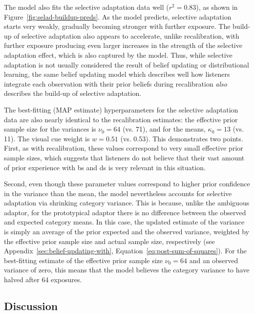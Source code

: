 The model also fits the selective adaptation data well ($r^2=0.83$), as shown in Figure~\ref{fig:selad-buildup-preds}.  As the model predicts, selective adaptation starts very weakly, gradually becoming stronger with further exposure.  The build-up of selective adaptation also appears to accelerate, unlike recalibration, with further exposure producing even larger increases in the strength of the selective adaptation effect, which is also captured by the model.  Thus, while selective adaptation is not usually considered the result of belief updating or distributional learning, the same belief updating model which describes well how listeners integrate each observation with their prior beliefs during recalibration \emph{also} describes the build-up of selective adaptation.

The best-fitting (MAP estimate) hyperparameters for the selective adaptation data are also nearly identical to the recalibration estimates: the effective prior sample size for the variances is $\nu_0=64$ (vs. 71), and for the means, $\kappa_0=13$ (vs. 11).  The visual cue weight is $w=0.51$ (vs. 0.53).  This demonstrates two points.  First, as with recalibration, these values correspond to very small effective prior sample sizes, which suggests that listeners do not believe that their vast amount of prior experience with \ph bs and \ph ds is very relevant in this situation.

Second, even though these parameter values correspond to higher prior confidence in the variance than the mean, the model nevertheless accounts for selective adaptation via shrinking category variance.  This is because, unlike the ambiguous adaptor, for the prototypical adaptor there is no difference between the observed and expected category means.  In this case, the updated estimate of the variance is simply an average of the prior expected and the observed variance, weighted by the effective prior sample size and actual sample size, respectively (see Appendix~\ref{sec:belief-updating-with}, Equation~\eqref{eq:post-sum-of-squares}).  For the best-fitting estimate of the effective prior sample size $\nu_0=64$ and an observed variance of zero, this means that the model believes the category variance to have halved after 64 exposures.

\subsection{Discussion}
\label{sec:discussion-sel-ad}


